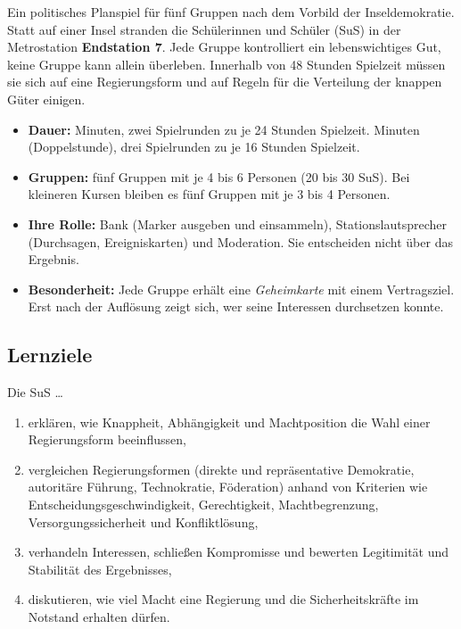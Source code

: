 \titelseite

Ein politisches Planspiel für fünf Gruppen nach dem Vorbild der Inseldemokratie. Statt auf einer Insel stranden die Schülerinnen und Schüler (SuS) in der Metrostation \textbf{Endstation 7}. Jede Gruppe kontrolliert ein lebenswichtiges Gut, keine Gruppe kann allein überleben. Innerhalb von 48 Stunden Spielzeit müssen sie sich auf eine Regierungsform und auf Regeln für die Verteilung der knappen Güter einigen.

\clearpage
{}

\begin{lkbox}[title={Auf einen Blick},fonttitle=\bfseries]
\begin{itemize}
  \item \textbf{Dauer:}
     Minuten, zwei Spielrunden zu je 24 Stunden Spielzeit.
     Minuten (Doppelstunde), drei Spielrunden zu je 16 Stunden Spielzeit.\fi
  \item \textbf{Gruppen:} fünf Gruppen mit je 4 bis 6 Personen (20 bis 30 SuS). Bei kleineren Kursen bleiben es fünf Gruppen mit je 3 bis 4 Personen.
  \item \textbf{Ihre Rolle:} Bank (Marker ausgeben und einsammeln), Stationslautsprecher (Durchsagen, Ereigniskarten) und Moderation. Sie entscheiden nicht über das Ergebnis.
  \item \textbf{Besonderheit:} Jede Gruppe erhält eine \emph{Geheimkarte} mit einem Vertragsziel. Erst nach der Auflösung zeigt sich, wer seine Interessen durchsetzen konnte.
\end{itemize}
\end{lkbox}

\subsection*{Lernziele}
Die SuS \ldots
\begin{enumerate}
  \item erklären, wie Knappheit, Abhängigkeit und Machtposition die Wahl einer Regierungsform beeinflussen,
  \item vergleichen Regierungsformen (direkte und repräsentative Demokratie, autoritäre Führung, Technokratie, Föderation) anhand von Kriterien wie Entscheidungsgeschwindigkeit, Gerechtigkeit, Machtbegrenzung, Versorgungssicherheit und Konfliktlösung,
  \item verhandeln Interessen, schließen Kompromisse und bewerten Legitimität und Stabilität des Ergebnisses,
  \item diskutieren, wie viel Macht eine Regierung und die Sicherheitskräfte im Notstand erhalten dürfen.
\end{enumerate}

